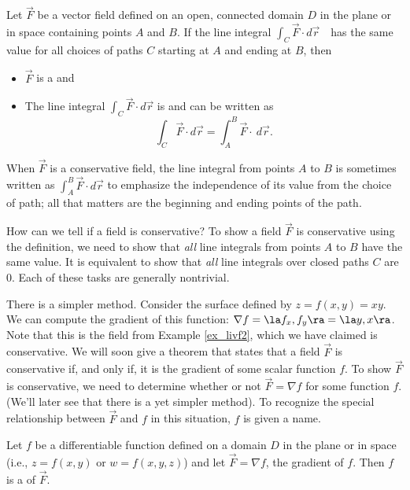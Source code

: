 {Let $\vec F$ be a vector field defined on an open, connected domain $D$ in the plane or in space  containing points $A$ and $B$. If the line integral
$\int_C \vec F\cdot d\vec r$\ \ has the same value for all choices of paths $C$ starting at $A$ and ending at $B$, then
\begin{itemize}
	\item $\vec F$ is a  and
	\item	The line integral $\int_C \vec F\cdot d\vec r$ is  and can be written as $$\int_C \vec F\cdot d\vec r = \int_A^B \vec F\cdot \ d\vec r.$$ 
\end{itemize}
}

When $\vec F$ is a conservative field, the line integral from points $A$ to $B$ is sometimes written as $\int_A^B\vec F\cdot d\vec r$ to emphasize the independence of its value from the choice of path; all that matters are the beginning and ending points of the path.

How can we tell if a field is conservative? To show a field $\vec F$ is conservative using the definition, we need to show that \emph{all} line integrals from points $A$ to $B$ have the same value. It is equivalent to show that \emph{all} line integrals over closed paths $C$ are 0. Each of these tasks are generally nontrivial.

There is a simpler method. Consider the surface defined by $z = f(x,y) = xy$. We can compute the gradient of this function: $\nabla f = \la f_x, f_y\ra = \la y, x\ra$. Note that this is the field from Example \ref{ex_livf2}, which we have claimed is conservative. We will soon give a theorem that states that a field $\vec F$ is conservative if, and only if, it is the gradient of some scalar function $f$. To show $\vec F$ is conservative, we need to determine whether or not $\vec F = \nabla f$ for some function $f$. (We'll later see that there is a yet simpler method). To recognize the special relationship between $\vec F$ and $f$ in this situation, $f$ is given a name.

{Let $f$ be a differentiable function defined on a  domain $D$ in the plane or in space (i.e., $z = f(x,y)$ or $w = f(x,y,z)$) and let $\vec F = \nabla f$, the gradient of $f$. Then $f$ is a  of $\vec F$.
}

